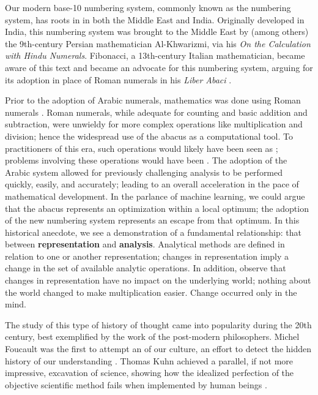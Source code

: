 Our modern base-10 numbering system, commonly known as the  numbering system, has roots in in both the Middle East and India.
Originally developed in India, this numbering system was brought to the Middle East by (among others) the 9th-century Persian mathematician Al-Khwarizmi, via his \textit{On the Calculation with Hindu Numerals}.
Fibonacci, a 13th-century Italian mathematician, became aware of this text and became an advocate for this numbering system, arguing for its adoption in place of Roman numerals in his \textit{Liber Abaci} \cite{ore} \cite{ferguson}.

Prior to the adoption of Arabic numerals, mathematics was done using Roman numerals \cite{heilbroner} \cite{gowers}.
Roman numerals, while adequate for counting and basic addition and subtraction, were unwieldy for more complex operations like multiplication and division; hence the widespread use of the abacus as a computational tool.
To practitioners of this era, such operations would likely have been seen as ; problems involving these operations would have been .
The adoption of the Arabic system allowed for previously challenging analysis to be performed quickly, easily, and accurately; leading to an overall acceleration in the pace of mathematical development.
In the parlance of machine learning, we could argue that the abacus represents an optimization within a local optimum; the adoption of the new numbering system represents an escape from that optimum.
In this historical anecdote, we see a demonstration of a fundamental relationship: that between \textbf{representation} and \textbf{analysis}.
Analytical methods are defined in relation to one or another representation; changes in representation imply a change in the set of available analytic operations.
In addition, observe that changes in representation have no impact on the underlying world; nothing about the world changed to make multiplication easier.
Change occurred only in the mind.

The study of this type of history of thought came into popularity during the 20th century, best exemplified by the work of the post-modern philosophers.
Michel Foucault was the first to attempt an  of our culture, an effort to detect the hidden history of our understanding \cite{foucault}.
Thomas Kuhn achieved a parallel, if not more impressive, excavation of science, showing how the idealized perfection of the objective scientific method fails when implemented by human beings \cite{kuhn}.


